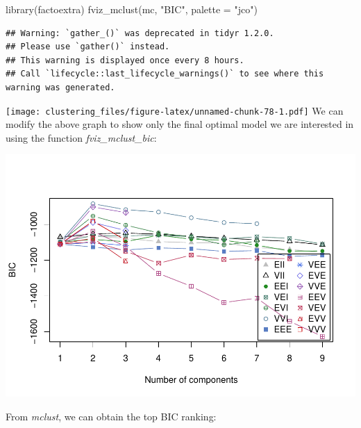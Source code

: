 \documentclass[
]{article}
\newenvironment{Shaded}{\begin{snugshade}}{\end{snugshade}}
\newcommand{\AttributeTok}[1]{\textcolor[rgb]{0.77,0.63,0.00}{#1}}
\newcommand{\FunctionTok}[1]{\textcolor[rgb]{0.00,0.00,0.00}{#1}}
\newcommand{\NormalTok}[1]{#1}
\newcommand{\SpecialCharTok}[1]{\textcolor[rgb]{0.00,0.00,0.00}{#1}}
\newcommand{\StringTok}[1]{\textcolor[rgb]{0.31,0.60,0.02}{#1}}
\begin{document}
\begin{Shaded}
\begin{Highlighting}[]
\FunctionTok{library}\NormalTok{(factoextra)}
\FunctionTok{fviz\_mclust}\NormalTok{(mc, }\StringTok{"BIC"}\NormalTok{, }\AttributeTok{palette =} \StringTok{"jco"}\NormalTok{)}
\end{Highlighting}
\end{Shaded}

\begin{verbatim}
## Warning: `gather_()` was deprecated in tidyr 1.2.0.
## Please use `gather()` instead.
## This warning is displayed once every 8 hours.
## Call `lifecycle::last_lifecycle_warnings()` to see where this warning was generated.
\end{verbatim}

\texttt{[image: clustering\_files/figure-latex/unnamed-chunk-78-1.pdf]}
We can modify the above graph to show only the final optimal model we
are interested in using the function \emph{fviz\_mclust\_bic}:

\begin{Shaded}
\end{Shaded}

\includegraphics{clustering_files/figure-latex/unnamed-chunk-79-1.pdf}

From \emph{mclust}, we can obtain the top BIC ranking:
\end{document}
